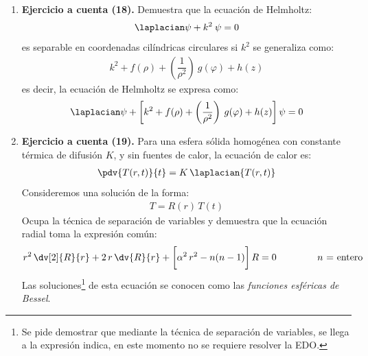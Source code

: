 \begin{enumerate}[label=\roman*)]
\item \textbf{Ejercicio a cuenta (18). } Demuestra que la ecuación de Helmholtz:
\begin{align*}
\laplacian \psi + k^{2} \: \psi = 0
\end{align*}
es separable en coordenadas cilíndricas circulares si $k^{2}$ se generaliza como:
\begin{align*}
k^{2} + f(\rho) + \left( \dfrac{1}{\rho^{2}} \right) \: g(\varphi) + h(z)
\end{align*}
es decir, la ecuación de Helmholtz se expresa como:
\begin{align*}
\laplacian \psi + \bigg[ k^{2} + f(\rho) + \left( \dfrac{1}{\rho^{2}} \right) \: g(\varphi) + h(z) \bigg] \, \psi = 0
\end{align*}
\item \textbf{Ejercicio a cuenta (19). } Para una esfera sólida homogénea con constante térmica de difusión $K$, y sin fuentes de calor, la ecuación de calor es:
\begin{align*}
\pdv{T(r,t)}{t} = K \, \laplacian{T(r, t)}
\end{align*}
Consideremos una solución de la forma:
\begin{align*}
T = R(r) \, T(t)
\end{align*}
Ocupa la técnica de separación de variables y demuestra que la ecuación radial toma la expresión común:
\begin{align*}
r^{2} \, \dv[2]{R}{r} + 2 \, r \, \dv{R}{r} + \bigg[ \alpha^{2} \, r^{2} - n (n - 1) \bigg] \, R = 0 \hspace{1.5cm} n \mbox{ = entero}
\end{align*}
Las soluciones\footnote{Se pide demostrar que mediante la técnica de separación de variables, se llega a la expresión indica, en este momento no se requiere resolver la EDO.} de esta ecuación se conocen como las \emph{funciones esféricas de Bessel}.

\end{enumerate}
